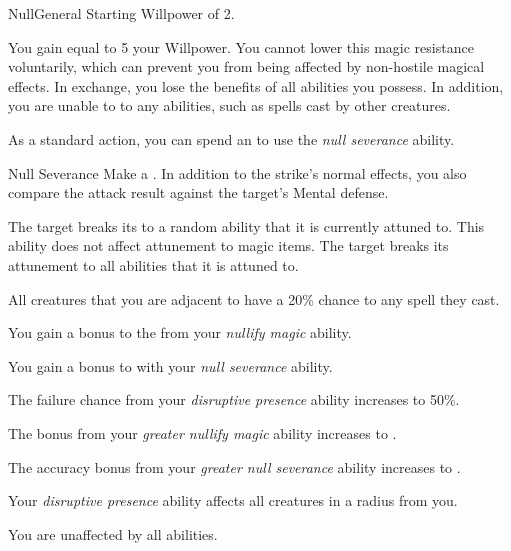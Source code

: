     \begin{feat}{Null}{General}
        \featpre Starting Willpower of 2.

         You gain  equal to 5 \add your Willpower.
        You cannot lower this magic resistance voluntarily, which can prevent you from being affected by non-hostile magical effects.
        In exchange, you lose the benefits of all  abilities you possess.
        In addition, you are unable to  to any  abilities, such as spells cast by other creatures.

         As a standard action, you can spend an  to use the \textit{null severance} ability.
        \begin{ability}{Null Severance}
            Make a .
            In addition to the strike's normal effects, you also compare the attack result against the target's Mental defense.

            \hit The target breaks its  to a random ability that it is currently attuned to.
            This ability does not affect attunement to magic items.
            \crit The target breaks its attunement to all abilities that it is attuned to.
        \end{ability}

         All creatures that you are adjacent to have a 20\% chance to  any spell they cast.

         You gain a  bonus to the  from your \textit{nullify magic} ability.

         You gain a  bonus to  with your \textit{null severance} ability.

         The failure chance from your \textit{disruptive presence} ability increases to 50\%.

         The bonus from your \textit{greater nullify magic} ability increases to .

         The accuracy bonus from your \textit{greater null severance} ability increases to .

         Your \textit{disruptive presence} ability affects all creatures in a \areamed radius  from you.

         You are unaffected by all  abilities.
    \end{feat}

